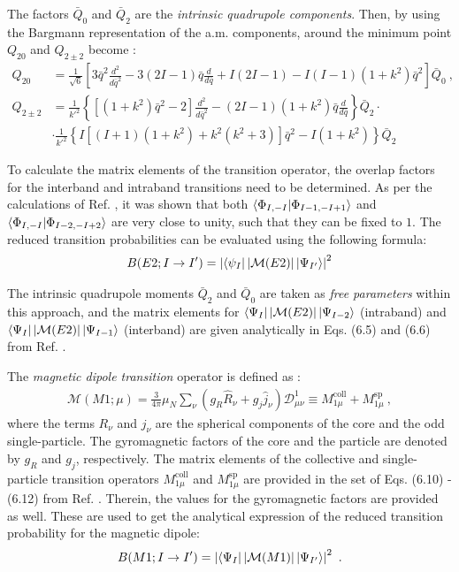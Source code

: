 The factors $\bar{Q}_0$ and $\bar{Q}_2$ are the \emph{intrinsic quadrupole components}. Then, by using the Bargmann representation of the a.m. components, around the minimum point $Q_{20}$ and $Q_{2\pm2}$ become \cite{raduta2020new}:
\begin{align}
    Q_{20}&=\frac{1}{\sqrt{6}}\left[3\bar{q}^2\frac{d^2}{d\bar{q}^2}-3(2I-1)\bar{q}\frac{d}{d\bar{q}}+I(2I-1)-I(I-1)(1+k^2)\bar{q}^2\right]\bar{Q}_0\ ,\nonumber\\
    Q_{2\pm2}&=\frac{1}{k'^2}\left\{\left[(1+k^2)\bar{q}^2-2\right]\frac{d^2}{d\bar{q}^2}-(2I-1)(1+k^2)\bar{q}\frac{d}{d\bar{q}}\right\}\bar{Q}_2\cdot \nonumber\\
    &\cdot\frac{1}{k'^2}\left\{I\left[(I+1)(1+k^2)+k^2(k^2+3)\right]\bar{q}^2-I(1+k^2)\right\}\bar{Q}_2
\end{align}

To calculate the matrix elements of the transition operator, the overlap factors for the interband and intraband transitions need to be determined. As per the calculations of Ref. \cite{raduta2020new}, it was shown that both $\bra{\Phi_{I,-I}}\ket{\Phi_{I-1,-I+1}}$ and $\bra{\Phi_{I,-I}}\ket{\Phi_{I-2,-I+2}}$ are very close to unity, such that they can be fixed to $1$. The reduced transition probabilities can be evaluated using the following formula:
\begin{align}
    B(E2;I\to I')=\left|\bra{\psi_I}|\mathcal{M}(E2)|\ket{\Psi_{I'}}\right|^2
    \label{reduced-electric-quadrupole-new-boson}
\end{align}

The intrinsic quadrupole moments $\bar{Q}_2$ and $\bar{Q}_0$ are taken as \emph{free parameters} within this approach, and the matrix elements for $\bra{\Psi_I}|\mathcal{M}(E2)|\ket{\Psi_{I-2}}$ (intraband) and $\bra{\Psi_I}|\mathcal{M}(E2)|\ket{\Psi_{I-1}}$ (interband) are given analytically in Eqs. (6.5) and (6.6) from Ref. \cite{raduta2020new}.

The \emph{magnetic dipole transition} operator is defined as \cite{raduta2020new}:
\begin{align}
    \mathcal{M}\left(M1;\mu\right)=\frac{3}{4\pi}\mu_N\sum_{\nu}\left(g_R\hat{R}_\nu+g_j\hat{j}_\nu\right)\mathcal{D}_{\mu\nu}^1\equiv M_{1\mu}^\text{coll}+M_{1\mu}^\text{sp}\ ,
\end{align}
where the terms $R_\nu$ and $j_\nu$ are the spherical components of the core and the odd single-particle. The gyromagnetic factors of the core and the particle are denoted by $g_R$ and $g_j$, respectively. The matrix elements of the collective and single-particle transition operators $M_{1\mu}^\text{coll}$ and $M_{1\mu}^\text{sp}$ are provided in the set of Eqs. (6.10) - (6.12) from Ref. \cite{raduta2020new}. Therein, the values for the gyromagnetic factors are provided as well. These are used to get the analytical expression of the reduced transition probability for the magnetic dipole:
\begin{align}
    B(M1;I\to I')=\left|\bra{\Psi_{I}}|\mathcal{M}(M1)|\ket{\Psi_{I'}}\right|^2\ .
    \label{reduced-magnetic-dipole-new-boson}
\end{align}

